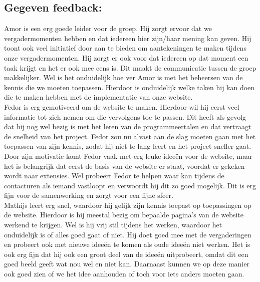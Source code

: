 \documentclass[12pt,a4paper,oneside]{article}
\begin{document}
\newpage

\subsection*{Gegeven feedback:}

Amor is een erg goede leider voor de groep. Hij zorgt ervoor dat we vergadermomenten hebben en dat iedereen hier zijn/haar mening kan geven. Hij toont ook veel initiatief door aan te bieden om aantekeningen te maken tijdens onze vergadermomenten. Hij zorgt er ook voor dat iedereen op dat moment een taak krijgt en het er ook mee eens is. Dit maakt de communicatie tussen de groep makkelijker. Wel is het onduidelijk hoe ver Amor is met het beheersen van de kennis die we moeten toepassen. Hierdoor is onduidelijk welke taken hij kan doen die te maken hebben met de implementatie van onze website. \\

Fedor is erg gemotiveerd om de website te maken. Hierdoor wil hij eerst veel informatie tot zich nemen om die vervolgens toe te passen. Dit heeft als gevolg dat hij nog wel bezig is met het leren van de programmeertalen en dat vertraagt de snelheid van het project. Fedor zou nu alvast aan de slag moeten gaan met het toepassen van zijn kennis, zodat hij niet te lang leert en het project sneller gaat. Door zijn motivatie komt Fedor vaak met erg leuke ideeën voor de website, maar het is belangrijk dat eerst de basis van de website er staat, voordat er gekeken wordt naar extensies. Wel probeert Fedor te helpen waar kan tijdens de contacturen als iemand vastloopt en verwoordt hij dit zo goed mogelijk. Dit is erg fijn voor de samenwerking en zorgt voor een fijne sfeer. \\

Mathijs leert erg snel, waardoor hij gelijk zijn kennis toepast op toepassingen op de website. Hierdoor is hij meestal bezig om bepaalde pagina's van de website werkend te krijgen. Wel is hij vrij stil tijdens het werken, waardoor het onduidelijk is of alles goed gaat of niet. Hij doet goed mee met de vergaderingen en probeert ook met nieuwe ideeën te komen als oude ideeën niet werken. Het is ook erg fijn dat hij ook een groot deel van de ideeën uitprobeert, omdat dit een goed beeld geeft wat nou wel en niet kan. Daarnaast kunnen we op deze manier ook goed zien of we het idee aanhouden of toch voor iets anders moeten gaan. 
\end{document}
